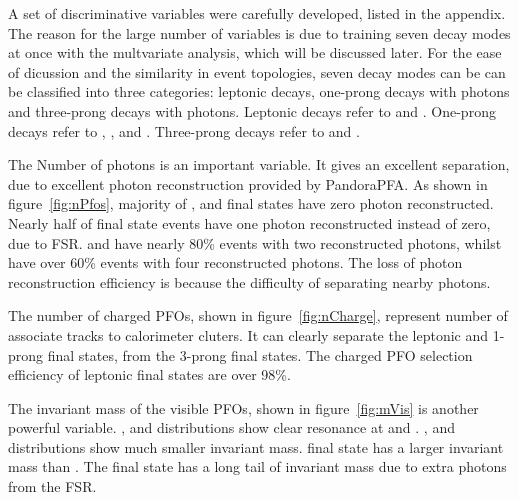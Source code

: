 \documentclass[a4paper,11pt]{article}
\newcommand{\decayElectron}{\Pem\PAGne\PGnGt}
\newcommand{\decayMuon}{\PGmm\PAGnGm\PGnGt}
\newcommand{\decayPion}{\PGpm\PGnGt}
\newcommand{\decayRho}{\PGrP{\PGpm\PGpz}\PGnGt}
\newcommand{\decayAiPhoton}{\PaDoP{\PGpm\PGpz\PGpz}\PGnGt}
\newcommand{\decayAiPion}{\PaDoP{\PGpm\PGpm\PGpp}\PGnGt}
\newcommand{\decayThreePionPhoton}{\PGpm\PGpm\PGpp\PGpz\PGnGt}
\begin{document}
A set of discriminative variables were carefully developed, listed in the appendix. The reason for the large number of variables is due to training seven decay modes at once with the multvariate analysis, which will be discussed later. For the ease of dicussion and the similarity in event topologies, seven decay modes can be can be classified into three categories: leptonic decays, one-prong decays with photons and three-prong decays with photons. Leptonic decays refer to \decayElectron and \decayMuon. One-prong decays refer to \decayPion, \decayRho, and \decayAiPhoton. Three-prong decays refer to \decayAiPion and \decayThreePionPhoton.




The Number of photons is an important variable. It gives an excellent separation, due to excellent photon reconstruction provided by PandoraPFA. As shown in figure~\ref{fig:nPfos}, majority of \decayMuon, \decayPion and \decayAiPion final states have zero photon reconstructed. Nearly half of \decayElectron final state events have one photon reconstructed instead of zero, due to FSR. \decayRho and \decayThreePionPhoton have nearly 80\% events with two reconstructed photons, whilst \decayAiPion have over 60\% events with four reconstructed photons. The loss of photon reconstruction efficiency is because the difficulty of separating nearby photons.

The number of charged PFOs, shown in figure~\ref{fig:nCharge}, represent number of associate tracks to calorimeter cluters. It can clearly separate the leptonic and 1-prong final states, from the 3-prong final states. The charged PFO selection efficiency of leptonic final states are over 98\%.

The invariant mass of the visible PFOs, shown in figure~\ref{fig:mVis} is another powerful variable. \decayRho, \decayAiPhoton and \decayAiPion distributions show clear resonance at  and . \decayElectron, \decayMuon and \decayPion distributions show much smaller invariant mass. \decayThreePionPhoton final state has a larger invariant mass than . The \decayElectron final state has a long tail of invariant mass due to extra photons from the FSR.
\end{document}
